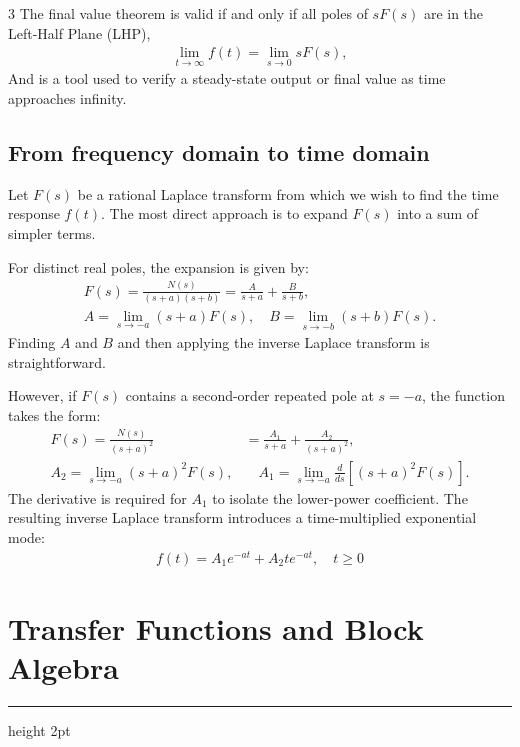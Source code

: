 \documentclass[10pt,landscape]{article}
\begin{document}
\begin{multicols*}{3}
    The final value theorem is valid if and only if all poles of $sF(s)$ are in the Left-Half Plane (LHP),
    \begin{align*}
        \lim_{t\rightarrow\infty}f(t)=\lim_{s\rightarrow0}sF(s),
    \end{align*}    
    And is a tool used to verify a steady-state output or final value as time approaches infinity.


    \subsection{From frequency domain to time domain}
    Let $F(s)$ be a rational Laplace transform from which we wish to find the time response $f(t)$. The most direct approach is to expand $F(s)$ into a sum of simpler terms. 

    For distinct real poles, the expansion is given by:
    \begin{align*}
        F(s)=\frac{N(s)}{(s+a)(s+b)}=\frac{A}{s+a}+\frac{B}{s+b},\\[1mm]
        A=\lim_{s\rightarrow -a}(s+a)F(s),\quad B=\lim_{s\rightarrow -b}(s+b)F(s).
    \end{align*}
    Finding $A$ and $B$ and then applying the inverse Laplace transform is straightforward.
    \newline

    However, if $F(s)$ contains a second-order repeated pole at $s = -a$, the function takes the form:
    \begin{align*}
        F(s) = \frac{N(s)}{(s+a)^2} &= \frac{A_1}{s+a} + \frac{A_2}{(s+a)^2}, \\[1mm]
        A_2 = \lim_{s\rightarrow -a}(s+a)^2 F(s), &\quad A_1 = \lim_{s\rightarrow -a}\frac{d}{ds}\left[(s+a)^2 F(s)\right].
    \end{align*}
    The derivative is required for $A_1$ to isolate the lower-power coefficient. The resulting inverse Laplace transform introduces a time-multiplied exponential mode:
    \begin{align*}
        \boxed{f(t) = A_1 e^{-at} + A_2 t e^{-at}, \quad t \ge 0}
    \end{align*}


\section{Transfer Functions and Block Algebra}\smallskip \hrule height 2pt \smallskip

\end{multicols*}
\end{document}
